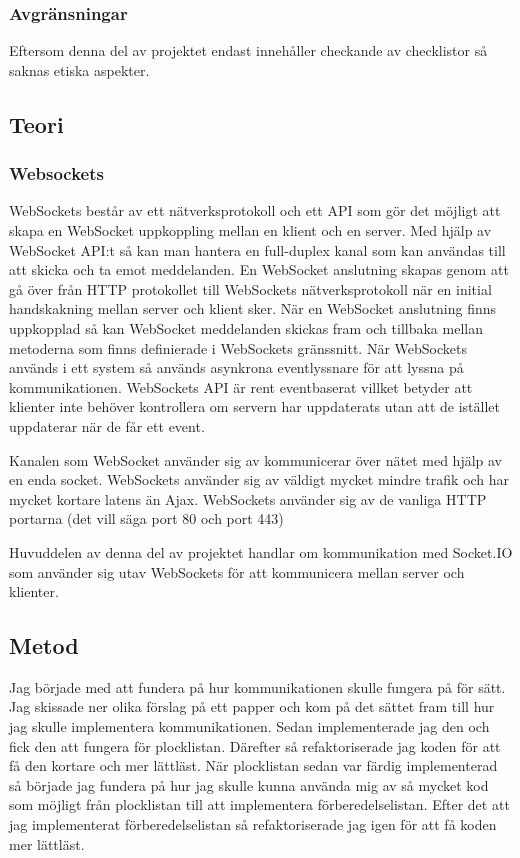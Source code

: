 \subsubsection{Avgränsningar}
Eftersom denna del av projektet endast innehåller checkande av checklistor så saknas etiska aspekter.

\pagebreak
\subsection{Teori}
\subsubsection{Websockets}
WebSockets består av ett nätverksprotokoll och ett API som gör det möjligt att skapa en WebSocket uppkoppling mellan en klient och en server. Med hjälp av WebSocket API:t så kan man hantera en full-duplex kanal som kan användas till att skicka och ta emot meddelanden. En WebSocket anslutning skapas genom att gå över från HTTP protokollet till WebSockets nätverksprotokoll när en initial handskakning mellan server och klient sker. När en WebSocket anslutning finns uppkopplad så kan WebSocket meddelanden skickas fram och tillbaka mellan metoderna som finns definierade i WebSockets gränssnitt. När WebSockets används i ett system så används asynkrona eventlyssnare för att lyssna på kommunikationen. WebSockets API är rent eventbaserat villket betyder att klienter inte behöver kontrollera om servern har uppdaterats utan att de istället uppdaterar när de får ett event. \cite{websocketbook}

Kanalen som WebSocket använder sig av kommunicerar över nätet med hjälp av en enda socket. WebSockets använder sig av väldigt mycket mindre trafik och har mycket kortare latens än Ajax. WebSockets använder sig av de vanliga HTTP portarna (det vill säga port 80 och port 443) \cite{websocketreport}

Huvuddelen av denna del av projektet handlar om kommunikation med Socket.IO som använder sig utav WebSockets för att kommunicera mellan server och klienter.

\pagebreak
 
\subsection{Metod}
Jag började med att fundera på hur kommunikationen skulle fungera på för sätt. Jag skissade ner olika förslag på ett papper och kom på det sättet fram till hur jag skulle implementera kommunikationen. Sedan implementerade jag den och fick den att fungera för plocklistan. Därefter så refaktoriserade jag koden för att få den kortare och mer lättläst. När plocklistan sedan var färdig implementerad så började jag fundera på hur jag skulle kunna använda mig av så mycket kod som möjligt från plocklistan till att implementera förberedelselistan. Efter det att jag implementerat förberedelselistan så refaktoriserade jag igen för att få koden mer lättläst.

